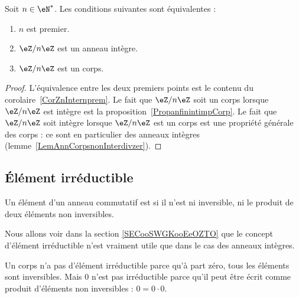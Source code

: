 \begin{proposition}     \label{PropzhFgNJ}
	Soit \( n\in\eN^*\). Les conditions suivantes sont équivalentes :
	\begin{enumerate}
		\item
		      \( n\) est premier.
		\item
		      \( \eZ/n\eZ\) est un anneau intègre.
		\item
		      \( \eZ/n\eZ\) est un corps.
	\end{enumerate}
\end{proposition}

\begin{proof}
	L'équivalence entre les deux premiers points est le contenu du corolaire~\ref{CorZnInternprem}. Le fait que \( \eZ/n\eZ\) soit un corps lorsque \( \eZ/n\eZ\) est intègre est la proposition~\ref{PropanfinintimpCorp}. Le fait que \( \eZ/n\eZ\) soit intègre lorsque \( \eZ/n\eZ\) est un corps est une propriété générale des corps : ce sont en particulier des anneaux intègres (lemme~\ref{LemAnnCorpsnonInterdivzer}).
\end{proof}

\subsection{Élément irréductible}

\begin{definition}  \label{DeirredBDhQfA}
	Un élément d'un anneau commutatif est  si il n'est ni inversible, ni le produit de deux éléments non inversibles.
\end{definition}

\begin{normaltext}
	Nous allons voir dans la section \ref{SECooSWGKooEeOZTO} que le concept d'élément irréductible n'est vraiment utile que dans le cas des anneaux intègres.
\end{normaltext}

\begin{example}
	Un corps n'a pas d'élément irréductible parce qu'à part zéro, tous les éléments sont inversibles. Mais \( 0\) n'est pas irréductible parce qu'il peut être écrit comme produit d'éléments non inversibles : \( 0=0\cdot 0\).
\end{example}

